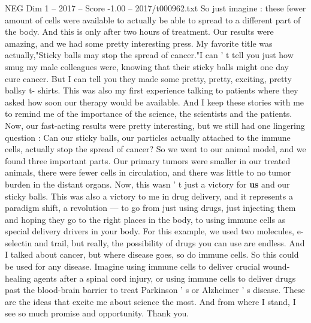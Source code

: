 \begin{textsample}{NEG Dim 1 – 2017 – Score -1.00 – 2017/t000962.txt}
So just imagine : these fewer amount of cells were available to actually be able to spread to a different part of the body.
And this is only after two hours of treatment.
Our results were amazing, and we had some pretty interesting press.
My favorite title was actually,"Sticky balls may stop the spread of cancer."I can ' t tell you just how smug my male colleagues were, knowing that their sticky balls might one day cure cancer.
But I can tell you they made some pretty, pretty, exciting, pretty ballsy t- shirts.
This was also my first experience talking to patients where they asked how soon our therapy would be available.
And I keep these stories with me to remind me of the importance of the science, the scientists and the patients.
Now, our fast-acting results were pretty interesting, but we still had one lingering question : Can our sticky balls, our particles actually attached to the immune cells, actually stop the spread of cancer?
So we went to our animal model, and we found three important parts.
Our primary tumors were smaller in our treated animals, there were fewer cells in circulation, and there was little to no tumor burden in the distant organs.
Now, this wasn ' t just a victory for \textbf{us} and our sticky balls.
This was also a victory to me in drug delivery, and it represents a paradigm shift, a revolution — to go from just using drugs, just injecting them and hoping they go to the right places in the body, to using immune cells as special delivery drivers in your body.
For this example, we used two molecules, e-selectin and trail, but really, the possibility of drugs you can use are endless.
And I talked about cancer, but where disease goes, so do immune cells.
So this could be used for any disease.
Imagine using immune cells to deliver crucial wound-healing agents after a spinal cord injury, or using immune cells to deliver drugs past the blood-brain barrier to treat Parkinson ' s or Alzheimer ' s disease.
These are the ideas that excite me about science the most.
And from where I stand, I see so much promise and opportunity.
Thank you.

\end{textsample}
